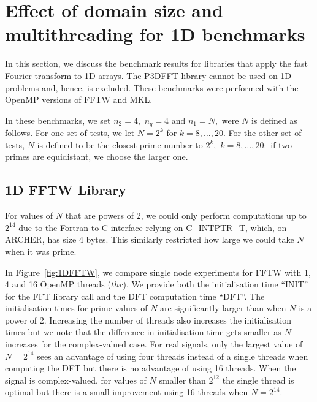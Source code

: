 \documentclass[a4paper]{article}
\begin{document}
\section{Effect of domain size and multithreading for 1D benchmarks}\label{Sec:1DMulti}

In this section, we discuss the benchmark results for libraries that
apply the fast Fourier transform to 1D arrays.  The P3DFFT library
cannot be used on 1D problems and, hence, is excluded. These
benchmarks were performed with the OpenMP versions of FFTW and MKL.

In these benchmarks, we set $n_2=4,$ $n_q=4$ and $n_1=N,$ were $N$ is
defined as follows.  For one set of tests, we let $N=2^k$ for
$k=8,\ldots,20.$ For the other set of tests, $N$ is defined to be the
closest prime number to $2^k,$ $k=8,\ldots,20:$ if two primes are
equidistant, we choose the larger one.


\subsection{1D FFTW Library}\label{Sec:1DFFTW}
For values of $N$ that are powers of 2, we could only perform
computations up to $2^{14}$ due to the Fortran to C interface relying on
C\_INTPTR\_T, which, on ARCHER, has size 4 bytes. This similarly
restricted how large we could take $N$ when it was prime.

In Figure~\ref{fig:1DFFTW}, we compare single node experiments for FFTW
with 1, 4 and 16 OpenMP threads ($thr$). We provide both the initialisation
time ``INIT'' for the FFT library call and the DFT computation time
``DFT''.  The initialisation times for prime values of $N$ are
significantly larger than when $N$ is a power of 2. Increasing the
number of threads also increases the initialisation times but we note
that the difference in initialisation time gets smaller as $N$
increases for the complex-valued case. For real signals, only the
largest value of $N=2^{14}$ sees an advantage of using four threads
instead of a single threads when computing the DFT but there is no
advantage of using 16 threads. When the signal is complex-valued, for
values of $N$ smaller than $2^{12}$ the single thread is optimal but
there is a small improvement using 16 threads when $N=2^{14}$.
\end{document}
